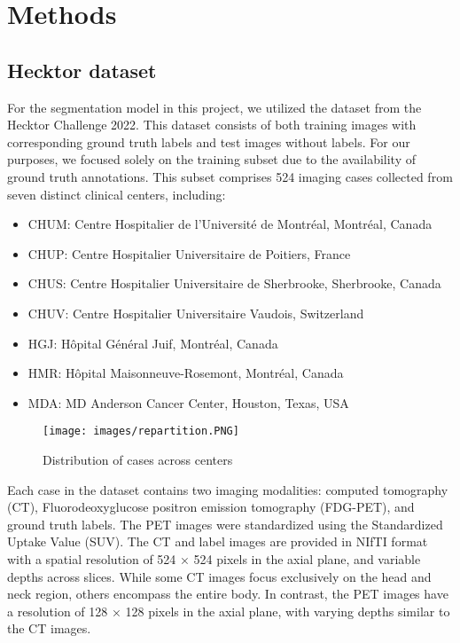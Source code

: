 \chapter{Methods}
\section{Hecktor dataset}
For the segmentation model in this project, we utilized the dataset from the Hecktor Challenge 2022. This dataset consists of both training images with corresponding ground truth labels and test images without labels. For our purposes, we focused solely on the training subset due to the availability of ground truth annotations. This subset comprises 524 imaging cases collected from seven distinct clinical centers, including:

\begin{itemize}
    \setlength\itemsep{1pt}
    \setlength\parskip{0pt}
    \setlength\topsep{0pt}
    \item CHUM: Centre Hospitalier de l’Université de Montréal, Montréal, Canada
    \item CHUP: Centre Hospitalier Universitaire de Poitiers, France
    \item CHUS: Centre Hospitalier Universitaire de Sherbrooke, Sherbrooke, Canada
    \item CHUV: Centre Hospitalier Universitaire Vaudois, Switzerland
    \item HGJ: Hôpital Général Juif, Montréal, Canada
    \item HMR: Hôpital Maisonneuve-Rosemont, Montréal, Canada
    \item MDA: MD Anderson Cancer Center, Houston, Texas, USA
\end{itemize}
\begin{figure}[ht]
    \centering
    \texttt{[image: images/repartition.PNG]}
    \caption{Distribution of cases across centers}
\end{figure}
\newpage
Each case in the dataset contains two imaging modalities: computed tomography (CT), Fluorodeoxyglucose positron emission tomography (FDG-PET), and ground truth labels. The PET images were standardized using the Standardized Uptake Value (SUV). The CT and label images are provided in NIfTI format with a spatial resolution of 524 × 524 pixels in the axial plane, and variable depths across slices. While some CT images focus exclusively on the head and neck region, others encompass the entire body. In contrast, the PET images have a resolution of 128 × 128 pixels in the axial plane, with varying depths similar to the CT images.

